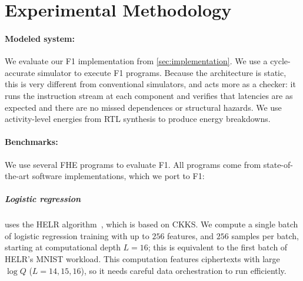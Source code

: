 


\section{Experimental Methodology}

\paragraph{Modeled system:}
We evaluate our F1 implementation from \autoref{sec:implementation}.
We use a cycle-accurate simulator to execute F1 programs.
Because the architecture is static, this is very different from conventional simulators,
and acts more as a checker: it runs the instruction stream at each component and verifies
that latencies are as expected and there are no missed dependences or structural hazards.
We use activity-level energies from RTL synthesis to produce energy breakdowns.

\paragraph{Benchmarks:}
We use several FHE programs to evaluate F1. %
All programs come from state-of-the-art software implementations, which we port to F1:

\subparagraph{Logistic regression}
uses the HELR algorithm~\cite{han:aaai19:logistic}, which is based on CKKS.
We compute a single batch of logistic regression training with up to $256$ features, and $256$ samples per batch,
starting at computational depth $L = 16$; this is equivalent to the first batch of HELR's MNIST workload. 
This computation features %
ciphertexts with large $\log Q$ ($L = 14,15,16$), so it needs careful data orchestration to run efficiently.

